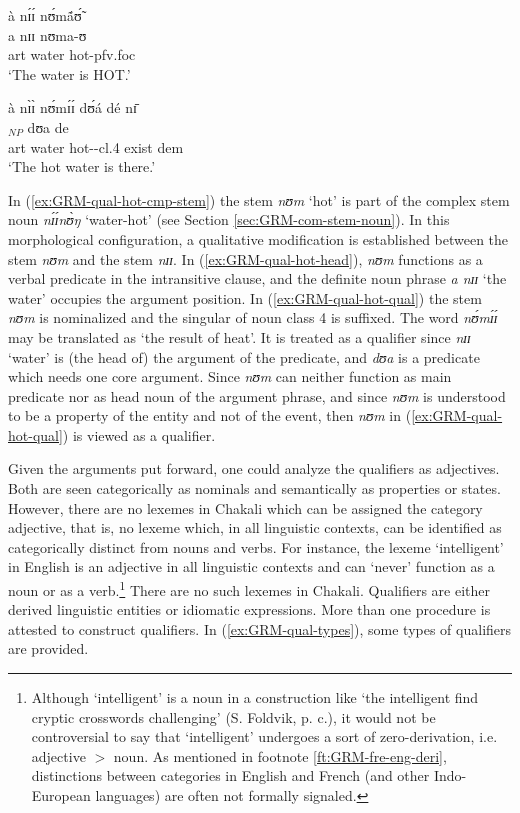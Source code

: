 \begin{exe}
\begin{exe}
\begin{exe}
{\begin{exe}
\begin{exe}
\begin{exe}
\begin{exe}
\begin{exe}
\begin{exe}
\begin{exe}
\begin{xlist}
\begin{exe}
 \ex\label{ex:GRM-qual-hot-head}
  \glll  à nɪ́ɪ́ nʊ́mã́ʊ̃́\\
 a  nɪɪ nʊma-ʊ\\
      {\sc art} water hot-{\sc pfv.foc}\\
  \glt `The water is HOT.'

 \ex\label{ex:GRM-qual-hot-qual}
  \glll  à nɪ̀ɪ̀ nʊ́mɪ́ɪ́ dʊ́á dé nɪ̄\\
 [a nɪɪ nʊm-ɪ-ɪ]$_{NP}$ dʊa de\\
  {\sc art} water hot-{\nmlz}-{\sc cl.4} exist {\sc dem}\\
  \glt `The hot water is there.'
  
\z 
 \z

In (\ref{ex:GRM-qual-hot-cmp-stem}) the stem {\it nʊm} `hot' is part of the
complex stem noun {\it nɪ́ɪ́nʊ̀ŋ} `water-hot' (see Section
\ref{sec:GRM-com-stem-noun}).  In this morphological configuration, a
qualitative
modification is  established  between the stem {\it nʊm} and the stem {\it nɪɪ}.
In (\ref{ex:GRM-qual-hot-head}), {\it nʊm}  functions as a verbal predicate in
the
intransitive clause, and the definite noun phrase {\it a nɪɪ} `the water'
occupies
the argument position. In (\ref{ex:GRM-qual-hot-qual}) the stem {\it nʊm} is
nominalized and the singular of  noun class 4 is suffixed. The word {\it 
nʊ́mɪ́ɪ́} may be translated as  `the result of heat'. It is treated as a
qualifier since {\it nɪɪ} `water' is  (the head of) the argument of the
predicate, and {\it dʊa} is a predicate which needs   one core argument. Since 
{\it nʊm}  can neither function as main predicate nor as head noun of the
argument phrase, and since {\it nʊm}  is understood to be a property of the
entity
and not of the event, then {\it nʊm} in (\ref{ex:GRM-qual-hot-qual}) is viewed 
as
a qualifier.


Given the arguments put forward, one could analyze the qualifiers as adjectives.
Both are  seen  categorically as nominals  and semantically as properties or
states.  However, there are no lexemes in Chakali  which can be assigned
the category adjective, that is, no lexeme which, in all  linguistic contexts,
can be identified as categorically distinct from nouns and verbs.  For instance,
the lexeme `intelligent' in English is an adjective in all linguistic contexts
and can `never' function as a noun or as  a verb.\footnote{Although
`intelligent' is a noun in a construction like `the
intelligent find cryptic crosswords challenging' (S. Foldvik, p. c.),  it would
not be
controversial to say that `intelligent'  undergoes a sort of  zero-derivation, 
i.e.
adjective $>$ noun.  As mentioned in footnote \ref{ft:GRM-fre-eng-deri},
distinctions between categories in English and French (and other Indo-European
languages) are often not formally signaled. }  There are no such lexemes in
Chakali. Qualifiers are
either derived
linguistic entities or idiomatic
expressions. More than one procedure is attested to construct qualifiers. In
(\ref{ex:GRM-qual-types}),   some types of qualifiers are provided.


\end{exe}
\end{xlist}
\end{exe}
\end{exe}
\end{exe}
\end{exe}
\end{exe}
\end{exe}
\end{exe}}
\end{exe}
\end{exe}
\end{exe}
